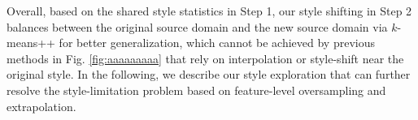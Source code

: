 \documentclass{article}
\theoremstyle{plain}
\theoremstyle{definition}
\theoremstyle{remark}
\newtheorem{remark}[theorem]{Remark}
\begin{document}

 
 
 Overall, based on the shared style statistics in Step 1, our style shifting in Step  2 balances between the original source domain and the new source domain via $k$-means++ for better generalization, which cannot be achieved by previous methods in Fig.  \ref{fig:aaaaaaaaa} that rely on interpolation or style-shift near the original style. %
 In the following, we  describe our  style exploration that can further resolve the style-limitation problem  based on feature-level oversampling and extrapolation. 


\end{document}
